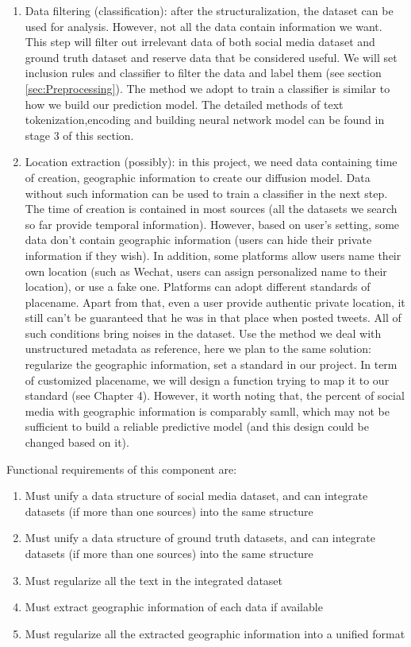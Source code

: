 \begin{enumerate}
    \item Data filtering (classification): after the structuralization, the dataset can be used for analysis. However, not all the data contain information we want. This step will filter out irrelevant data of both social media dataset and ground truth dataset and reserve data that be considered useful. We will set inclusion rules and classifier to filter the data and label them (see section \ref{sec:Preprocessing}). The method we adopt to train a classifier is similar to how we build our prediction model. The detailed methods of text tokenization,encoding and building neural network model can be found in stage 3 of this section.
    \item Location extraction (possibly): in this project, we need data containing time of creation, geographic information to create our diffusion model. Data without such information can be used to train a classifier in the next step. The time of creation is contained in most sources (all the datasets we search so far provide temporal information). However, based on user's setting, some data don't contain geographic information (users can hide their private information if they wish). In addition, some platforms allow users name their own location (such as Wechat, users can assign personalized name to their location), or use a fake one. Platforms can adopt different standards of placename. Apart from that, even a user provide authentic private location, it still can't be guaranteed that he was in that place when posted tweets. All of such conditions bring noises in the dataset. Use the method we deal with unstructured metadata as reference, here we plan to the same solution: regularize the geographic information, set a standard in our project. In term of customized placename, we will design a function trying to map it to our standard (see Chapter 4). However, it worth noting that, the percent of social media with geographic information is comparably samll, which may not be sufficient to build a reliable predictive model (and this design could be changed based on it).
\end{enumerate}
Functional requirements of this component are:
\begin{enumerate}
    \item Must unify a data structure of social media dataset, and can integrate datasets (if more than one sources) into the same structure
    \item Must unify a data structure of ground truth datasets, and can integrate datasets (if more than one sources) into the same structure
    \item Must regularize all the text in the integrated dataset
    \item Must extract geographic information of each data if available
    \item Must regularize all the extracted geographic information into a unified format
\end{enumerate}
